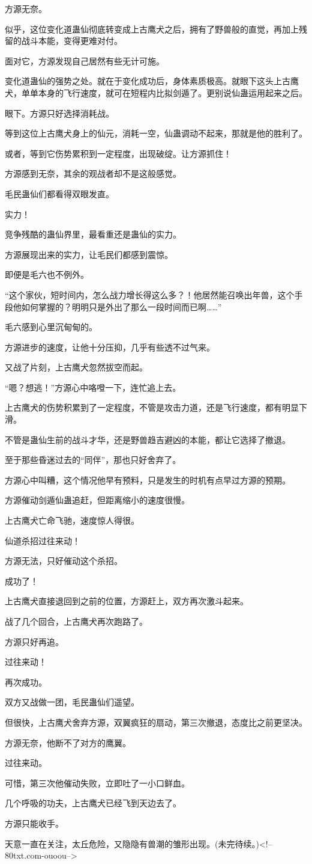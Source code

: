 \begin{this_body}
方源无奈。

似乎，这位变化道蛊仙彻底转变成上古鹰犬之后，拥有了野兽般的直觉，再加上残留的战斗本能，变得更难对付。

面对它，方源发现自己居然有些无计可施。

变化道蛊仙的强势之处。就在于变化成功后，身体素质极高。就眼下这头上古鹰犬，单单本身的飞行速度，就可在短程内比拟剑遁了。更别说仙蛊运用起来之后。

眼下。方源只好选择消耗战。

等到这位上古鹰犬身上的仙元，消耗一空，仙蛊调动不起来，那就是他的胜利了。

或者，等到它伤势累积到一定程度，出现破绽。让方源抓住！

方源感到无奈，其余的观战者却不是这般感觉。

毛民蛊仙们都看得双眼发直。

实力！

竞争残酷的蛊仙界里，最看重还是蛊仙的实力。

方源展现出来的实力，让毛民们都感到震惊。

即便是毛六也不例外。

“这个家伙，短时间内，怎么战力增长得这么多？！他居然能召唤出年兽，这个手段他如何掌握的？明明只是外出了那么一段时间而已啊……”

毛六感到心里沉甸甸的。

方源进步的速度，让他十分压抑，几乎有些透不过气来。

又战了片刻，上古鹰犬忽然拔空而起。

“嗯？想逃！”方源心中咯噔一下，连忙追上去。

上古鹰犬的伤势积累到了一定程度，不管是攻击力道，还是飞行速度，都有明显下滑。

不管是蛊仙生前的战斗才华，还是野兽趋吉避凶的本能，都让它选择了撤退。

至于那些昏迷过去的“同伴”，那也只好舍弃了。

方源心中叫糟，这个情况他早有预料，只是发生的时机有点早过方源的预期。

方源催动剑遁仙蛊追赶，但距离缩小的速度很慢。

上古鹰犬亡命飞驰，速度惊人得很。

仙道杀招过往来动！

方源无法，只好催动这个杀招。

成功了！

上古鹰犬直接退回到之前的位置，方源赶上，双方再次激斗起来。

战了几个回合，上古鹰犬再次跑路了。

方源只好再追。

过往来动！

再次成功。

双方又战做一团，毛民蛊仙们遥望。

但很快，上古鹰犬舍弃方源，双翼疯狂的扇动，第三次撤退，态度比之前更坚决。

方源无奈，他断不了对方的鹰翼。

过往来动。

可惜，第三次他催动失败，立即吐了一小口鲜血。

几个呼吸的功夫，上古鹰犬已经飞到天边去了。

方源只能收手。

天意一直在关注，太丘危险，又隐隐有兽潮的雏形出现。(未完待续。)<!--80txt.com-ouoou-->

\end{this_body}

